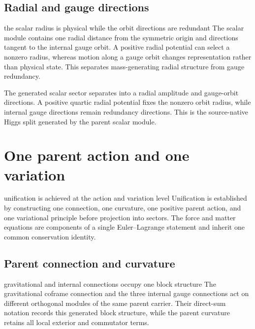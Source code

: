 \documentclass[11pt]{article}
\numberwithin{equation}{section}
\theoremstyle{remark}
\begin{document}
\subsection{Radial and gauge directions}
\begin{interpretivebridge}{the scalar radius is physical while the orbit directions are redundant}
The scalar module contains one radial distance from the symmetric origin and directions tangent to the internal gauge orbit. A positive radial potential can select a nonzero radius, whereas motion along a gauge orbit changes representation rather than physical state. This separates mass-generating radial structure from gauge redundancy.
\end{interpretivebridge}

The generated scalar sector separates into a radial amplitude and gauge-orbit directions. A positive quartic radial potential fixes the nonzero orbit radius, while internal gauge directions remain redundancy directions. This is the source-native Higgs split generated by the parent scalar module.

\section{One parent action and one variation}
\begin{conceptledger}{unification is achieved at the action and variation level}
Unification is established by constructing one connection, one curvature, one positive parent action, and one variational principle before projection into sectors. The force and matter equations are components of a single Euler--Lagrange statement and inherit one common conservation identity.
\end{conceptledger}

\label{sec:action}

\subsection{Parent connection and curvature}
\begin{interpretivebridge}{gravitational and internal connections occupy one block structure}
The gravitational coframe connection and the three internal gauge connections act on different orthogonal modules of the same parent carrier. Their direct-sum notation records this generated block structure, while the parent curvature retains all local exterior and commutator terms.
\end{interpretivebridge}
\end{document}
